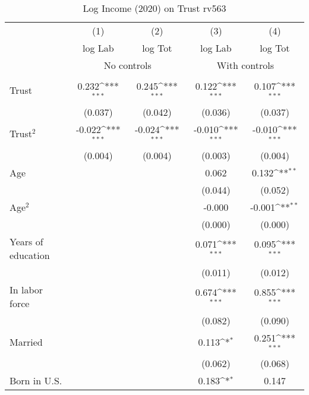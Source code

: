 \begin{table}[htbp]\centering
\def\sym#1{\ifmmode^{#1}\else\(^{#1}\)\fi}
\caption{Log Income (2020) on Trust rv563}
\begin{tabular}{l*{4}{c}}
\toprule
          &\multicolumn{1}{c}{(1)}&\multicolumn{1}{c}{(2)}&\multicolumn{1}{c}{(3)}&\multicolumn{1}{c}{(4)}\\
          &\multicolumn{1}{c}{log Lab}&\multicolumn{1}{c}{log Tot}&\multicolumn{1}{c}{log Lab}&\multicolumn{1}{c}{log Tot}\\
& \multicolumn{2}{c}{No controls} & \multicolumn{2}{c}{With controls} \\\\ \cmidrule(lr){2-3}\cmidrule(lr){4-5}
Trust     &    0.232\sym{***}&    0.245\sym{***}&    0.122\sym{***}&    0.107\sym{***}\\
          &  (0.037)         &  (0.042)         &  (0.036)         &  (0.037)         \\
Trust$^{2}$&   -0.022\sym{***}&   -0.024\sym{***}&   -0.010\sym{***}&   -0.010\sym{***}\\
          &  (0.004)         &  (0.004)         &  (0.003)         &  (0.004)         \\
Age       &                  &                  &    0.062         &    0.132\sym{**} \\
          &                  &                  &  (0.044)         &  (0.052)         \\
Age$^{2}$ &                  &                  &   -0.000         &   -0.001\sym{**} \\
          &                  &                  &  (0.000)         &  (0.000)         \\
Years of education&                  &                  &    0.071\sym{***}&    0.095\sym{***}\\
          &                  &                  &  (0.011)         &  (0.012)         \\
In labor force&                  &                  &    0.674\sym{***}&    0.855\sym{***}\\
          &                  &                  &  (0.082)         &  (0.090)         \\
Married   &                  &                  &    0.113\sym{*}  &    0.251\sym{***}\\
          &                  &                  &  (0.062)         &  (0.068)         \\
Born in U.S.&                  &                  &    0.183\sym{*}  &    0.147         \\

\end{tabular}
\end{table}

